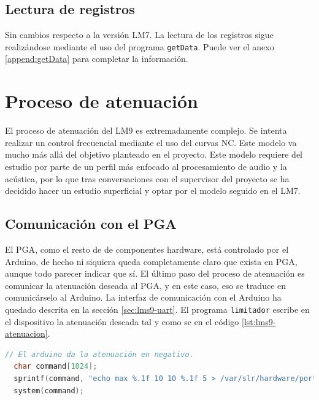 \subsection{Lectura de registros}

Sin cambios respecto a la versión \acrshort{LM7}. La lectura de los registros sigue realizándose mediante el uso del programa \verb|getData|. Puede ver el anexo \ref{append:getData} para completar la información.

\section{Proceso de atenuación} \label{sec:lms9-atenuacion}

El proceso de atenuación del \acrshort{LM9} es extremadamente complejo. Se intenta realizar un control frecuencial mediante el uso del curvas NC\cite{curvas-nc}. Este modelo va mucho más allá del objetivo planteado en el proyecto. Este modelo requiere del estudio por parte de un perfil más enfocado al procesamiento de audio y la acústica, por lo que tras conversaciones con el supervisor del proyecto se ha decidido hacer un estudio superficial y optar por el modelo seguido en el \acrshort{LM7}.

\subsection{Comunicación con el \acrshort{PGA}}

El \acrshort{PGA}, como el resto de de componentes hardware, está controlado por el Arduino, de hecho ni siquiera queda completamente claro que exista en \acrshort{PGA}, aunque todo parecer indicar que sí. El último paso del proceso de atenuación es comunicar la atenuación deseada al \acrshort{PGA}, y en este caso, eso se traduce en comunicárselo al Arduino. La interfaz de comunicación con el Arduino ha quedado descrita en la sección \ref{sec:lms9-uart}. El programa \verb|limitador| escribe en el dispositivo la atenuación deseada tal y como se en el código \ref{lst:lms9-atenuacion}. \\

\begin{lstlisting}[language=c++, caption={Comunicación de la atenuación deseada en el \acrshort{LM9}.}, label={lst:lms9-atenuacion}]
  // El arduino da la atenuación en negativo.
  char command[1024];
  sprintf(command, "echo max %.1f 10 10 %.1f 5 > /var/slr/hardware/port", -desiredAt, 0.0f);
  system(command);
\end{lstlisting}
